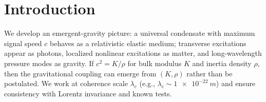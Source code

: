 
\section{Introduction}
We develop an emergent-gravity picture: a universal condensate with maximum signal speed $c$ behaves as a relativistic elastic medium; transverse excitations appear as photons, localized nonlinear excitations as matter, and long-wavelength pressure modes as gravity. If $c^2 = K/\rho$ for bulk modulus $K$ and inertia density $\rho$, then the gravitational coupling can emerge from $(K,\rho)$ rather than be postulated. We work at coherence scale $\lambda_c$ (e.g., $\lambda_c\sim \SI{1e-22}{m}$) and ensure consistency with Lorentz invariance and known tests.
